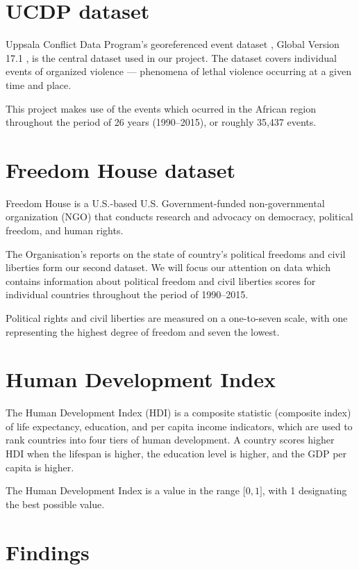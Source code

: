 \documentclass[a4paper,11pt]{article}
\begin{document}
\section{UCDP dataset}

Uppsala Conflict Data Program's georeferenced event dataset \cite{Sundberg:13},
Global Version 17.1 \cite{Codebook2017}, is the central dataset used in our project.
The dataset covers individual events of organized violence --- phenomena of
lethal violence occurring at a given time and place.

This project makes use of the events which ocurred in the African region
throughout the period of 26 years (1990--2015), or roughly 35,437 events.

\section{Freedom House dataset}

Freedom House is a U.S.-based U.S. Government-funded non-governmental
organization (NGO) that conducts research and advocacy on democracy,
political freedom, and human rights.

The Organisation's reports on the state of country's political freedoms and
civil liberties form our second dataset.
We will focus our attention on data
which contains information about political freedom and civil liberties
scores for individual countries throughout the period of 1990--2015.

Political rights and civil liberties are measured on a one-to-seven
scale, with one representing the highest degree of freedom and seven the
lowest.

\section{Human Development Index}

The Human Development Index (HDI) is a composite statistic (composite
index) of life expectancy, education, and per capita income indicators,
which are used to rank countries into four tiers of human development. A
country scores higher HDI when the lifespan is higher, the education
level is higher, and the GDP per capita is higher.

The Human Development Index is a value in the range ${[}0,1{]}$, with 1 designating
the best possible value.

\section{Findings}
\end{document}
